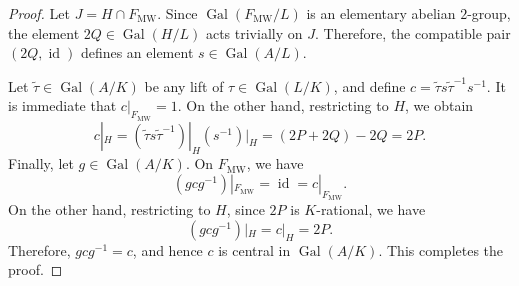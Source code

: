 \documentclass[10pt,a4paper]{amsart}
\newcommand{\Gal}{\operatorname{Gal}}
\begin{document}
\begin{proof}
	Let	$J=H\cap F_{\mathrm{MW}}$. Since $\Gal(F_{\mathrm{MW}}/L)$ is an elementary abelian
	$2$-group, the element $2Q\in\Gal(H/L)$ acts trivially on $J$.
	Therefore, the compatible pair	$(2Q,\operatorname{id})$
	defines an element $ s\in\Gal(A/L)$.
	
	Let $\widetilde{\tau}\in\Gal(A/K)$	be any lift of $\tau\in\Gal(L/K)$, and define
$
	c=\widetilde{\tau}s\widetilde{\tau}^{-1}s^{-1}.
$
	It is immediate that $c|_{F_{\mathrm{MW}}}=1$.
	On the other hand, restricting to $H$, we obtain
	\[
	c|_H
	=
	(\widetilde{\tau}s\widetilde{\tau}^{-1})|_H(s^{-1})|_H
	=
	(2P+2Q)-2Q
	=
	2P.
	\]
Finally, let $g\in \Gal(A/K)$. On $F_{\mathrm{MW}}$, we have
\[
(gcg^{-1})|_{F_{\mathrm{MW}}}
=
\operatorname{id}
=
c|_{F_{\mathrm{MW}}}.
\]
On the other hand, restricting to $H$, since $2P$ is $K$-rational, we have
\[
(gcg^{-1})|_H=c|_H=2P.
\]
Therefore, $gcg^{-1}=c$, and hence $c$ is central in
$\Gal(A/K)$. This completes the proof.
\end{proof}
\end{document}
